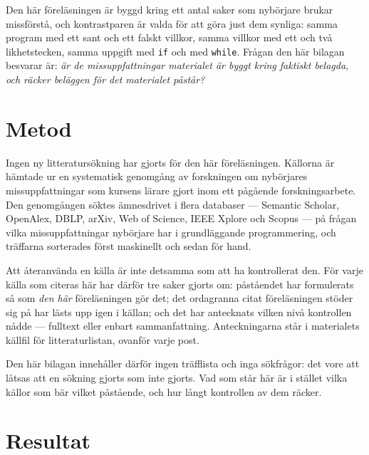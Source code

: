 Den här föreläsningen är byggd kring ett antal saker som nybörjare
brukar missförstå, och kontrastparen är valda för att göra just dem
synliga: samma program med ett sant och ett falskt villkor, samma
villkor med ett och två likhetstecken, samma uppgift med
\texttt{if} och med \texttt{while}.  Frågan den
här bilagan besvarar är: \emph{är de missuppfattningar materialet är
byggt kring faktiskt belagda, och räcker beläggen för det materialet
påstår?}

\section{Metod}
\label{sec:cond-metod}

Ingen ny litteratursökning har gjorts för den här föreläsningen.
Källorna är hämtade ur en systematisk genomgång av forskningen om
nybörjares missuppfattningar som kursens lärare gjort inom ett pågående
forskningsarbete\autocite{SooriBosk2026}.  Den genomgången söktes
ämnesdrivet i flera databaser
--- Semantic Scholar, OpenAlex, DBLP, arXiv, Web of Science, IEEE Xplore
och Scopus --- på frågan vilka missuppfattningar nybörjare har i
grundläggande programmering, och träffarna sorterades först maskinellt
och sedan för hand.

Att återanvända en källa är inte detsamma som att ha kontrollerat den.
För varje källa som citeras här har därför tre saker gjorts om:
påståendet har formulerats så som \emph{den här} föreläsningen gör det;
det ordagranna citat föreläsningen stöder sig på har lästs upp igen i
källan; och det har antecknats vilken nivå kontrollen nådde --- fulltext
eller enbart sammanfattning.  Anteckningarna står i materialets källfil
för litteraturlistan, ovanför varje post.

Den här bilagan innehåller därför ingen träfflista och inga sökfrågor:
det vore att låtsas att en sökning gjorts som inte gjorts.  Vad som står
här är i stället vilka källor som bär vilket påstående, och hur långt
kontrollen av dem räcker.

\section{Resultat}
\label{sec:cond-resultat}

